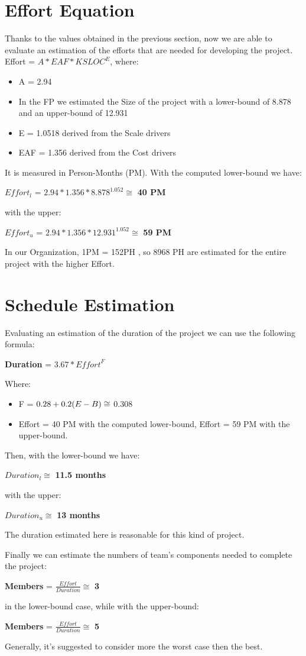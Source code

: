 \section{Effort Equation}
Thanks to the values obtained in the previous section, now we are able to evaluate an estimation of the efforts that are needed for developing the project.  Effort = $A * EAF * KSLOC^E $, where:  
\begin{itemize}
\item A = 2.94 
\item In the FP we estimated the Size of the project with a lower-bound of 8.878 and an upper-bound of 12.931
\item E = 1.0518 derived from the Scale drivers
\item EAF = 1.356 derived from the Cost drivers
\end{itemize}
It is measured in Person-Months (PM).
With the computed lower-bound we have: 
\\\begin{center} $Effort_l$ = $ 2.94 * 1.356 * 8.878^{1.052} \cong$ \textbf{40 PM}\end{center}
with the upper:
\\\begin{center} $Effort_u$ = $2.94 * 1.356 * 12.931^{1.052} \cong$ \textbf{59 PM} \end{center}

In our Organization, 1PM = 152PH , so 8968 PH are estimated for the entire project with the higher Effort.

\section{Schedule Estimation}
Evaluating an estimation of the duration of the project we can use the following formula:
\begin{center}\textbf{Duration} = $3.67 * \textit{Effort}^F$  \end{center}
Where:
\begin{itemize}
\item F = $0.28 + 0.2 \* (E - B) \cong$  0.308
\item Effort = 40 PM with the computed lower-bound, Effort = 59 PM with the upper-bound.
\end{itemize}
Then, with the lower-bound we have: 
\begin{center}$Duration_l \cong$ \textbf{11.5 months} \end{center}
with the upper:
\begin{center}$Duration_u \cong$ \textbf{13 months} \end{center}
The duration estimated here is reasonable for this kind of project.

Finally we can estimate the numbers of team's components needed to complete the project:
\begin{center}\textbf{Members} = $\frac{Effort}{Duration} \cong$ \textbf{3}\end{center}
in the lower-bound case, while with the upper-bound:
\begin{center}\textbf{Members} = $\frac{Effort}{Duration} \cong$ \textbf{5}\end{center}
Generally, it's suggested to consider more the worst case then the best.
